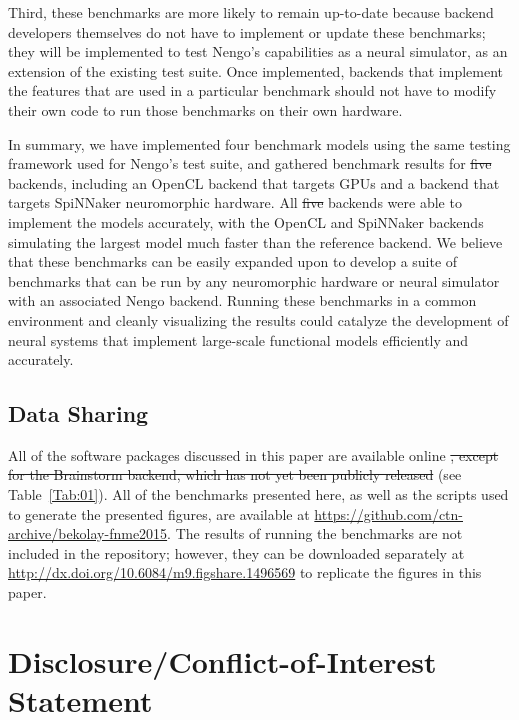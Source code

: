 \documentclass{frontiersSCNS}
\providecommand{\DIFadd}[1]{{\protect\color{blue}\uwave{#1}}} %
\providecommand{\DIFdel}[1]{{\protect\color{red}\sout{#1}}}                      %
\providecommand{\DIFaddbegin}{} %
\providecommand{\DIFaddend}{} %
\providecommand{\DIFdelbegin}{} %
\providecommand{\DIFdelend}{} %
\begin{document}
Third, these benchmarks are more likely to
remain up-to-date because backend developers
themselves do not have to implement or update
these benchmarks;
they will be implemented to test Nengo's
capabilities as a neural simulator,
as an extension of the existing test suite.
Once implemented, backends that implement
the features that are used in a particular benchmark
should not have to modify their own code
to run those benchmarks on their own hardware.

In summary, we have implemented
four benchmark models using the same
testing framework used for Nengo's test suite,
and gathered benchmark results
for \DIFdelbegin \DIFdel{five }\DIFdelend \DIFaddbegin \DIFadd{four }\DIFaddend backends,
including an OpenCL backend that targets GPUs
and a backend that targets
SpiNNaker neuromorphic hardware.
All \DIFdelbegin \DIFdel{five }\DIFdelend \DIFaddbegin \DIFadd{four }\DIFaddend backends were able to implement
the models accurately,
with the OpenCL and SpiNNaker backends
simulating the largest model much faster
than the reference backend.
We believe that these benchmarks
can be easily expanded upon
to develop a suite of benchmarks
that can be run by any neuromorphic hardware
or neural simulator
with an associated Nengo backend.
Running these benchmarks in a common environment
and cleanly visualizing the results
could catalyze the development of
neural systems that implement
large-scale functional models
efficiently and accurately.

\subsection{Data Sharing}

All of the software packages discussed in this paper
are available online
\DIFdelbegin \DIFdel{,
except for the Brainstorm backend,
which has not yet been publicly released
}\DIFdelend (see Table~\ref{Tab:01}).
All of the benchmarks presented here,
as well as the scripts used to generate
the presented figures,
are available at
\url{https://github.com/ctn-archive/bekolay-fnme2015}.
The results of running the benchmarks
are not included in the repository;
however, they can be downloaded separately at
\url{http://dx.doi.org/10.6084/m9.figshare.1496569}
to replicate the figures in this paper.

\section*{Disclosure/Conflict-of-Interest Statement}
\end{document}
